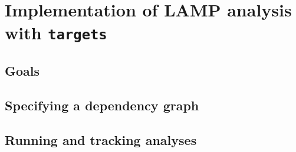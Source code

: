 \documentclass[../thesis.tex]{subfiles}
\begin{document}
\section{Implementation of LAMP analysis with \texttt{targets} \label{sec:lamp_targets}}

\subsection{Goals}

\subsection{Specifying a dependency graph}

\subsection{Running and tracking analyses}


\dobib %
 
\end{document}
